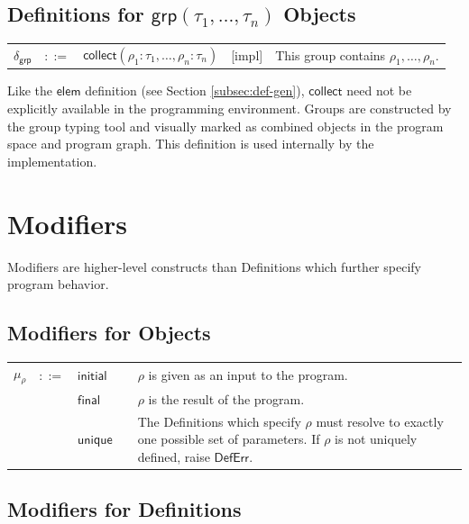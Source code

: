 \documentclass[twoside,openright,11pt]{report}
\begin{document}
\subsection{Definitions for $\mathsf{grp}(\tau_1, \dots , \tau_n)$ Objects}
\label{subsec:def-grp}

\noindent\begin{tabularx}{\textwidth}{p{0.5cm} p{0.5cm} p{5cm} c X}
$\delta_{\mathsf{grp}}$ & $::=$ & $\mathsf{collect}(\rho_1 : \tau_1, \dots, \rho_n : \tau_n)$ & [impl] & This group contains $\rho_1, \dots, \rho_n$.
\end{tabularx}

Like the $\mathsf{elem}$ definition (see Section \ref{subsec:def-gen}), $\mathsf{collect}$ need not be explicitly available in the programming environment. 
Groups are constructed by the group typing tool and visually marked as combined objects in the program space and program graph. 
This definition is used internally by the implementation.

\section{Modifiers}
\label{sec:mods}

Modifiers are higher-level constructs than Definitions which further specify program behavior.

\subsection{Modifiers for Objects}
\label{subsec:mods-obj}

\noindent\begin{tabularx}{\textwidth}{p{0.5cm} p{0.5cm} p{5cm} c X}
$\mu_{\rho}$ & $::=$ & $\mathsf{initial}$ &  & $\rho$ is given as an input to the program. \\
 & & $\mathsf{final}$ &  & $\rho$ is the result of the program. \\
 & & $\mathsf{unique}$ &  & The Definitions which specify $\rho$ must resolve to exactly one possible set of parameters. If $\rho$ is not uniquely defined, raise $\mathsf{DefErr}$.
\end{tabularx}

\subsection{Modifiers for Definitions}
\label{subsec:mods-defs}
\end{document}
